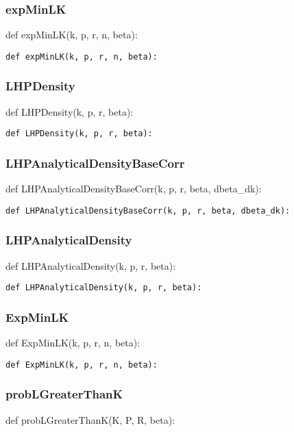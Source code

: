 \documentclass[twoside,11pt]{book}
\begin{document}
\subsubsection*{{\bf expMinLK}}
def expMinLK(k, p, r, n, beta): 

\begin{lstlisting}
def expMinLK(k, p, r, n, beta):
\end{lstlisting}

\subsubsection*{{\bf LHPDensity}}
def LHPDensity(k, p, r, beta): 

\begin{lstlisting}
def LHPDensity(k, p, r, beta):
\end{lstlisting}

\subsubsection*{{\bf LHPAnalyticalDensityBaseCorr}}
def LHPAnalyticalDensityBaseCorr(k, p, r, beta, dbeta\_dk): 

\begin{lstlisting}
def LHPAnalyticalDensityBaseCorr(k, p, r, beta, dbeta_dk):
\end{lstlisting}

\subsubsection*{{\bf LHPAnalyticalDensity}}
def LHPAnalyticalDensity(k, p, r, beta): 

\begin{lstlisting}
def LHPAnalyticalDensity(k, p, r, beta):
\end{lstlisting}

\subsubsection*{{\bf ExpMinLK}}
def ExpMinLK(k, p, r, n, beta): 

\begin{lstlisting}
def ExpMinLK(k, p, r, n, beta):
\end{lstlisting}

\subsubsection*{{\bf probLGreaterThanK}}
def probLGreaterThanK(K, P, R, beta): 
\end{document}
